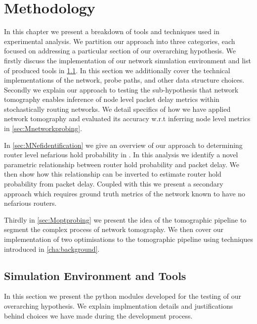 \chapter{Methodology}
\label{cha:methodology}
In this chapter we present a breakdown of tools and techniques used in experimental analysis. We partition our approach into three categories, each focused on addressing a particular section of our overarching hypothesis. We firstly discuss the implementation of our network simulation environment and list of produced tools in \cref{sec:Msimenvironment}. In this section we additionally cover the technical implementations of the network, probe paths, and other data structure choices. Secondly we explain our approach to testing the sub-hypothesis that network tomography enables inference of node level packet delay metrics within stochastically routing networks. We detail specifics of how we have applied network tomography and evaluated its accuracy w.r.t inferring node level metrics in \cref{sec:Mnetworkprobing}.\par
In \cref{sec:MNefidentification} we give an overview of our approach to determining router level nefarious hold probability in . In this analysis we identify a novel parametric relationship between router hold probability and packet delay. We then show how this relationship can be inverted to estimate router hold probability from packet delay. Coupled with this we present a secondary approach which requires ground truth metrics of the network known to have no nefarious routers.\par
Thirdly in \cref{sec:Moptprobing} we present the idea of the tomographic pipeline to segment the complex process of network tomography. We then cover our implementation of two optimisations to the tomographic pipeline using techniques introduced in \cref{cha:background}.

\section{Simulation Environment and Tools}
\label{sec:Msimenvironment}
In this section we present the python modules developed for the testing of our overarching hypothesis. We explain implmentation details and justifications behind choices we have made during the development process.

\cite{virtanen_scipy_2020}

